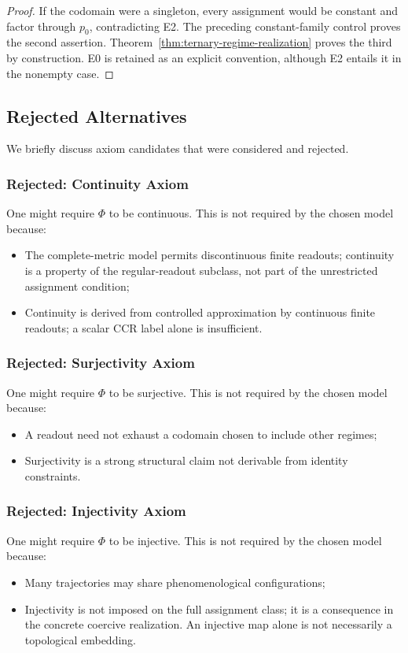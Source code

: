 \documentclass[11pt,a4paper]{article}
\theoremstyle{plain}
\theoremstyle{definition}
\theoremstyle{remark}
\begin{document}
\begin{proof}
If the codomain were a singleton, every assignment would be constant and factor through $p_0$, contradicting E2. The preceding constant-family control proves the second assertion. Theorem~\ref{thm:ternary-regime-realization} proves the third by construction. E0 is retained as an explicit convention, although E2 entails it in the nonempty case.
\end{proof}

\subsection{Rejected Alternatives}

We briefly discuss axiom candidates that were considered and rejected.

\subsubsection{Rejected: Continuity Axiom}
One might require $\Phi$ to be continuous. This is not required by the chosen model because:
\begin{itemize}[leftmargin=*]
    \item The complete-metric model permits discontinuous finite readouts; continuity is a property of the regular-readout subclass, not part of the unrestricted assignment condition;
    \item Continuity is derived from controlled approximation by continuous finite readouts; a scalar CCR label alone is insufficient.
\end{itemize}

\subsubsection{Rejected: Surjectivity Axiom}
One might require $\Phi$ to be surjective. This is not required by the chosen model because:
\begin{itemize}[leftmargin=*]
    \item A readout need not exhaust a codomain chosen to include other regimes;
    \item Surjectivity is a strong structural claim not derivable from identity constraints.
\end{itemize}

\subsubsection{Rejected: Injectivity Axiom}
One might require $\Phi$ to be injective. This is not required by the chosen model because:
\begin{itemize}[leftmargin=*]
    \item Many trajectories may share phenomenological configurations;
    \item Injectivity is not imposed on the full assignment class; it is a consequence in the concrete coercive realization. An injective map alone is not necessarily a topological embedding.
\end{itemize}
\end{document}
